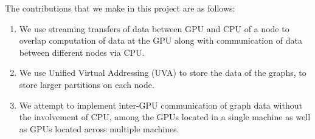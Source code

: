 The contributions that we make in this project are as follows:
\begin{enumerate}
\item We use streaming transfers of data between GPU and CPU of a node to overlap computation of data at the GPU along with communication of data between different nodes via CPU. 
\item We use Unified Virtual Addressing (UVA) to store the data of the graphs, to store larger partitions on each node. 
\item We attempt to implement inter-GPU communication of graph data without the involvement of CPU, among the GPUs located in a single machine as well as GPUs located across multiple machines. 
\end{enumerate}
